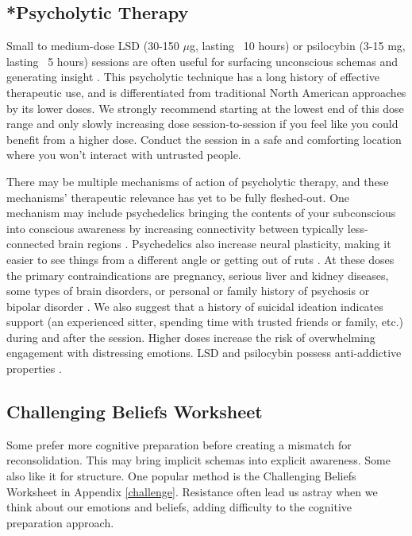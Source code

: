 \documentclass[12pt,letterpaper]{article}
\begin{document}
\subsection{*Psycholytic Therapy}
\label{psychedelics}
Small to medium-dose LSD (30-150 $\mu$g, lasting ~10 hours) or psilocybin (3-15 mg, lasting ~5 hours) sessions are often useful for surfacing unconscious schemas and generating insight \cite{passiePsycholytic}. This psycholytic technique has a long history of effective therapeutic use, and is differentiated from traditional North American approaches by its lower doses. We strongly recommend starting at the lowest end of this dose range and only slowly increasing dose session-to-session if you feel like you could benefit from a higher dose. Conduct the session in a safe and comforting location where you won't interact with untrusted people.


There may be multiple mechanisms of action of psycholytic therapy, and these mechanisms' therapeutic relevance has yet to be fully fleshed-out. One mechanism may include psychedelics bringing the contents of your subconscious into conscious awareness by increasing connectivity between typically less-connected brain regions \cite{tagliazucchiConnectivity}. Psychedelics also increase neural plasticity, making it easier to see things from a different angle or getting out of ruts \cite{nardou2023psychedelics}. At these doses the primary contraindications are pregnancy, serious liver and kidney diseases, some types of brain disorders, or personal or family history of psychosis or bipolar disorder \cite{schlagPsychedelicAdverseEffects,passiePsycholytic}. We also suggest that a history of suicidal ideation indicates support (an experienced sitter, spending time with trusted friends or family, etc.) during and after the session. Higher doses increase the risk of overwhelming engagement with distressing emotions. LSD and psilocybin possess anti-addictive properties \cite{principeAddiction}.
\subsection{Challenging Beliefs Worksheet}
\label{challengingBeliefsWorksheet}
Some prefer more cognitive preparation before creating a mismatch for reconsolidation.  This may bring implicit schemas into explicit awareness. Some also like it for structure. One popular method is the Challenging Beliefs Worksheet in Appendix \ref{challenge}. Resistance often lead us astray when we think about our emotions and beliefs, adding difficulty to the cognitive preparation approach.
\end{document}
